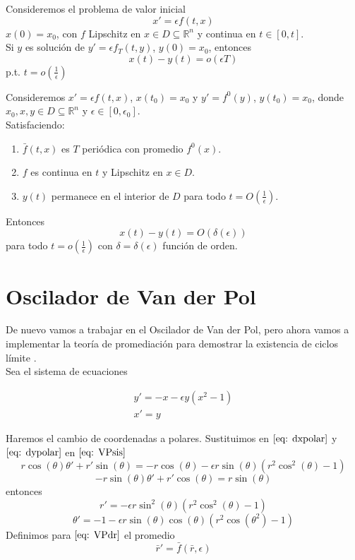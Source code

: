\begin{lemma}
	Consideremos el problema de valor inicial
	\[ 
		x'=\epsilon f(t,x)
	\]
	$x(0)=x_0$, con $f$ Lipschitz en $x\in D\subseteq\mathbb{R}^n$ y continua
	en $t\in[0,t]$. \\
	Si $y$ es solución de $y'=\epsilon f_T(t,y)$, $y(0)=x_0$, entonces
	\[ 
		x(t)-y(t)=o(\epsilon T)
	\]
	p.t. $t=o(\frac{1}{\epsilon})$
\end{lemma}

\begin{theorem}
	Consideremos $x'=\epsilon f(t,x)$, $x(t_0)=x_0$ y $y'=f^0(y)$, $y(t_0)=x_0$,
	donde $x_0,x,y\in D\subseteq\mathbb{R}^n$ y $\epsilon\in[0,\epsilon_0]$.\\

	Satisfaciendo:
	\begin{enumerate}
		\item $\bar{f}(t,x)$ es $T$ periódica con promedio $f^0(x)$.
		\item $f$ es continua en $t$ y Lipschitz en $x\in D$.
		\item $y(t)$ permanece en el interior de $D$ para todo $t=O(\frac{1}{\epsilon})$.
	\end{enumerate}
	Entonces
	\[ 
	x(t)-y(t)=O(\delta(\epsilon))
	\]
	para todo $t=o(\frac{1}{\epsilon})$ con $\delta=\delta(\epsilon)$ función de orden.
\end{theorem}

\section{Oscilador de Van der Pol}
De nuevo vamos a trabajar en el Oscilador de Van der Pol, pero ahora vamos a implementar la teoría de promediación para demostrar la existencia de ciclos límite \cite{strogatz2018nonlinear}.\\

Sea el sistema de ecuaciones

\begin{equation}\label{eq: VPsis}
	\begin{matrix}
		y'=-x-\epsilon y(x^2-1) \\ 
		x'=y
	\end{matrix}
\end{equation}

Haremos el cambio de coordenadas a polares.
Sustituimos en $\eqref{eq: dxpolar}$ y $\eqref{eq: dypolar}$ en $\eqref{eq: VPsis}$
$$r\cos(\theta)\theta'+r'\sin(\theta)=-r\cos(\theta)-\epsilon r\sin(\theta)(r^2\cos^2(\theta)-1)$$
$$-r\sin(\theta)\theta'+r'\cos(\theta)=r\sin(\theta)$$
entonces
\begin{equation}\label{eq: VPdr}
	r'=-\epsilon r\sin^2(\theta)(r^2\cos^2(\theta)-1)
\end{equation}
\begin{equation}\label{eq: VPdtheta}
	\theta'=-1-\epsilon r\sin(\theta)\cos(\theta)(r^2\cos(\theta^2)-1)
\end{equation}
Definimos para $\eqref{eq: VPdr}$ el promedio
\begin{equation}\label{eq: drbar}
	\bar{r}'=\bar{f}(\bar{r},\epsilon)
\end{equation}


